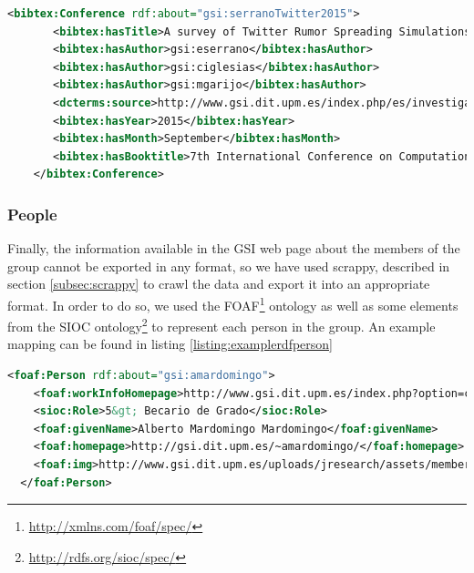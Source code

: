 \begin{center} 
  \begin{lstlisting}[language=XML, captionpos=b, caption=Example bibtex document converted to RDF, label=listing:examplerdfbibtex]   
   <bibtex:Conference rdf:about="gsi:serranoTwitter2015">
       <bibtex:hasTitle>A survey of Twitter Rumor Spreading Simulations</bibtex:hasTitle>
       <bibtex:hasAuthor>gsi:eserrano</bibtex:hasAuthor>
       <bibtex:hasAuthor>gsi:ciglesias</bibtex:hasAuthor>
       <bibtex:hasAuthor>gsi:mgarijo</bibtex:hasAuthor>
       <dcterms:source>http://www.gsi.dit.upm.es/index.php/es/investigacion/publicaciones.bibtex?controller=publications&amp;task=export&amp;id=364</dcterms:source>
       <bibtex:hasYear>2015</bibtex:hasYear>
       <bibtex:hasMonth>September</bibtex:hasMonth>
       <bibtex:hasBooktitle>7th International Conference on Computational Collective Intelligence Technologies and Applications</bibtex:hasBooktitle>
    </bibtex:Conference>
 \end{lstlisting}
\end{center}

\subsubsection{People}

Finally, the information available in the GSI web page about the members of the group cannot be exported in any format, so we have used scrappy, described in section \ref{subsec:scrappy} to crawl the data and export it into an appropriate format. In order to do so, we used the \ac{FOAF}\footnote{\url{http://xmlns.com/foaf/spec/}} ontology as well as some elements from the \ac{SIOC} ontology\footnote{\url{http://rdfs.org/sioc/spec/}} to represent each person in the group. An example mapping can be found in listing \ref{listing:examplerdfperson}

\begin{center} 
  \begin{lstlisting}[language=XML, captionpos=b, caption=Example semantic data about a member of the group, label=listing:examplerdfperson]   
  <foaf:Person rdf:about="gsi:amardomingo">
    <foaf:workInfoHomepage>http://www.gsi.dit.upm.es/index.php?option=com_jresearch&amp;view=member&amp;task=show&amp;id=84</foaf:workInfoHomepage>
    <sioc:Role>5&gt; Becario de Grado</sioc:Role>
    <foaf:givenName>Alberto Mardomingo Mardomingo</foaf:givenName>
    <foaf:homepage>http://gsi.dit.upm.es/~amardomingo/</foaf:homepage>
    <foaf:img>http://www.gsi.dit.upm.es/uploads/jresearch/assets/members/Foto.jpg</foaf:img>
  </foaf:Person>
 \end{lstlisting}
\end{center}

